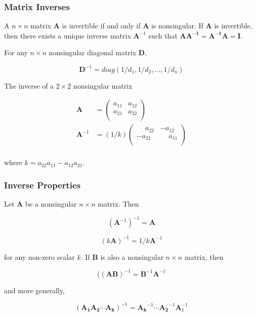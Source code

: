 \documentclass{beamer}
\begin{document}
\begin{frame}
\frametitle{Matrix Inverses}
A $n \times n$ matrix $\mathbf{A}$ is invertible if and only if $\mathbf{A}$ is nonsingular.  If $\mathbf{A}$ is invertible, then there exists a unique inverse matrix $\mathbf{A}^{-1}$ such that $\mathbf{AA^{-1}} = \mathbf{A^{-1}A} = \mathbf{I}$.  
\vspace{5mm}

For any $n \times n$ nonsingular diagonal matrix $\mathbf{D}$,

\[ \mathbf{D}^{-1} = diag(1/d_1, 1/d_2, \hdots, 1/d_n)\]

The inverse of a $2 \times 2$ nonsingular matrix

\begin{align*}
\mathbf{A} &= \begin{pmatrix}
    a_{11} & a_{12} \\
    a_{21} & a_{22}  \\  
\end{pmatrix}\\
    \mathbf{A}^{-1} &= (1/k)\begin{pmatrix}
    \phantom{-}a_{22} & -a_{12} \\
    -a_{21} & \phantom{-}a_{11}  \\  
\end{pmatrix}\\
\end{align*}

where $k = a_{22}a_{11} - a_{12}a_{21}$.
\end{frame}

\begin{frame}
\frametitle{Inverse Properties}
Let $\mathbf{A}$ be a nonsingular $n \times n$ matrix.  Then

\[(\mathbf{A}^{-1})^{-1} = \mathbf{A}\]

\[(k\mathbf{A})^{-1} = 1/k\mathbf{A}^{-1}\]

for any non-zero scalar $k$.  If $\mathbf{B}$ is also a nonsingular $n \times n$ matrix, then 

\[((\mathbf{AB})^{-1} = \mathbf{B}^{-1}\mathbf{A}^{-1}\]

and more generally,

\[(\mathbf{A_1 A_2 \cdots A_k})^{-1} = \mathbf{A_k}^{-1}\cdots \mathbf{A_2}^{-1} \mathbf{A}_1^{-1}\]
\end{frame}
\end{document}
